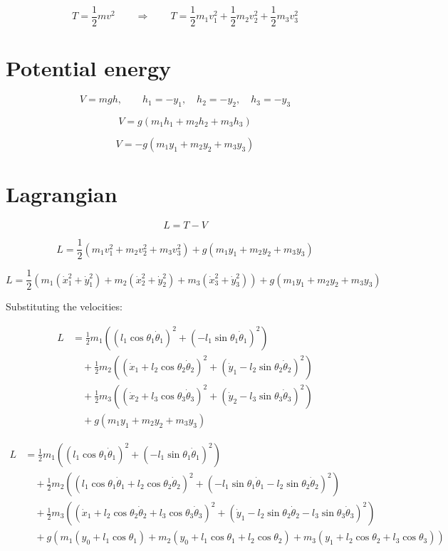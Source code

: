 \documentclass[11pt,a4paper]{article}
\begin{document}
\[ T = \frac{1}{2} m v^2 \qquad \Longrightarrow \qquad T = \frac{1}{2} m_1 v_1^2 + \frac{1}{2} m_2 v_2^2 + \frac{1}{2} m_3 v_3^2 \]

\section{Potential energy}

\[ V = m g h, \qquad h_1 = -y_1, \quad h_2 = -y_2, \quad h_3 = -y_3 \]

\[ V = g (m_1 h_1 + m_2 h_2 + m_3 h_3) \]

\[ V = -g (m_1 y_1 + m_2 y_2 + m_3 y_3) \]

\section{Lagrangian}

\[ L = T - V \]

\[ L = \frac{1}{2} (m_1 v_1^2 + m_2 v_2^2 + m_3 v_3^2) + g (m_1 y_1 + m_2 y_2 + m_3 y_3) \]

\[ L = \frac{1}{2} \left( m_1 (\dot{x}_1^2 + \dot{y}_1^2) + m_2 (\dot{x}_2^2 + \dot{y}_2^2) + m_3 (\dot{x}_3^2 + \dot{y}_3^2) \right) + g (m_1 y_1 + m_2 y_2 + m_3 y_3) \]

Substituting the velocities:

\begin{align*}
L &= \frac{1}{2} m_1 \left( (l_1 \cos\theta_1 \dot{\theta}_1)^2 + (-l_1 \sin\theta_1 \dot{\theta}_1)^2 \right) \\
    &\quad + \frac{1}{2} m_2 \left( (\dot{x}_1 + l_2 \cos\theta_2 \dot{\theta}_2)^2 + (\dot{y}_1 - l_2 \sin\theta_2 \dot{\theta}_2)^2 \right) \\
    &\quad + \frac{1}{2} m_3 \left( (\dot{x}_2 + l_3 \cos\theta_3 \dot{\theta}_3)^2 + (\dot{y}_2 - l_3 \sin\theta_3 \dot{\theta}_3)^2 \right) \\
    &\quad + g (m_1 y_1 + m_2 y_2 + m_3 y_3)
\end{align*}

\begin{align*}
L &= \frac{1}{2} m_1 \left( (l_1 \cos\theta_1 \dot{\theta}_1)^2 + (-l_1 \sin\theta_1 \dot{\theta}_1)^2 \right) \\
    &\quad + \frac{1}{2} m_2 \left( (l_1 \cos\theta_1 \dot{\theta}_1 + l_2 \cos\theta_2 \dot{\theta}_2)^2 + (-l_1 \sin\theta_1 \dot{\theta}_1 - l_2 \sin\theta_2 \dot{\theta}_2)^2 \right) \\
    &\quad + \frac{1}{2} m_3 \left( (\dot{x}_1 + l_2 \cos\theta_2 \dot{\theta}_2 + l_3 \cos\theta_3 \dot{\theta}_3)^2 + (\dot{y}_1 - l_2 \sin\theta_2 \dot{\theta}_2 - l_3 \sin\theta_3 \dot{\theta}_3)^2 \right) \\
    &\quad + g \left( m_1 (y_0 + l_1 \cos\theta_1) + m_2 (y_0 + l_1 \cos\theta_1 + l_2 \cos\theta_2) + m_3 (y_1 + l_2 \cos\theta_2 + l_3 \cos\theta_3) \right)
\end{align*}
\end{document}
